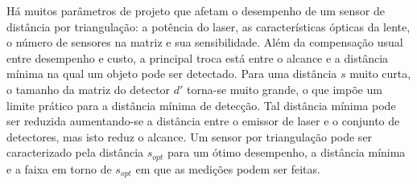 Há muitos parâmetros de projeto que afetam o desempenho de um sensor de distância por triangulação: a potência do laser, as características ópticas da lente, o número de sensores na matriz e sua sensibilidade. Além da compensação usual entre desempenho e custo, a principal troca está entre o alcance e a distância mínima na qual um objeto pode ser detectado. Para uma distância $s$ muito curta, o tamanho da matriz do detector $d'$ torna-se muito grande, o que impõe um limite prático para a distância mínima de detecção. Tal distância mínima pode ser reduzida aumentando-se a distância entre o emissor de laser e o conjunto de detectores, mas isto reduz o alcance. Um sensor por triangulação pode ser caracterizado pela distância $s_{\textit{opt}}$ para um ótimo desempenho, a distância mínima e a faixa em torno de $s_{\textit{opt}}$ em que as medições podem ser feitas.


